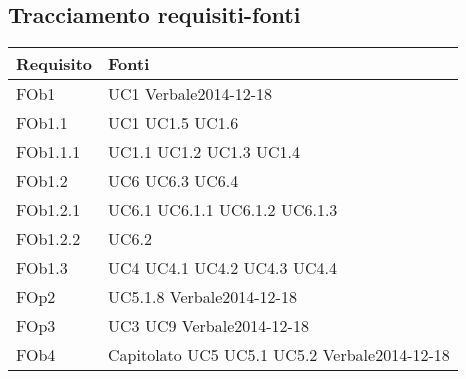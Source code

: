 \subsection{ Tracciamento requisiti-fonti}
	
\begin{longtable}{|l|p{4cm}|}
\hline
\textbf{Requisito} & \textbf{Fonti} \\
\hline
FOb1 & UC1 \linebreak Verbale2014-12-18 \linebreak \\ 
\hline
FOb1.1 & UC1 \linebreak  UC1.5 \linebreak  UC1.6 \linebreak  \\ 
\hline
FOb1.1.1 & UC1.1 \linebreak  UC1.2 \linebreak  UC1.3 \linebreak  UC1.4 \linebreak  \\ 
\hline
FOb1.2 & UC6 \linebreak  UC6.3 \linebreak  UC6.4 \linebreak  \\ 
\hline
FOb1.2.1 & UC6.1 \linebreak  UC6.1.1 \linebreak  UC6.1.2 \linebreak  UC6.1.3 \linebreak  \\ 
\hline
FOb1.2.2 & UC6.2 \linebreak  \\ 
\hline
FOb1.3 & UC4 \linebreak  UC4.1 \linebreak  UC4.2 \linebreak  UC4.3 \linebreak  UC4.4 \linebreak  \\ 
\hline
FOp2 & UC5.1.8 \linebreak Verbale2014-12-18 \linebreak \\ 
\hline
FOp3 & UC3 \linebreak UC9 \linebreak Verbale2014-12-18 \linebreak \\ 
\hline
FOb4 & Capitolato \linebreak UC5 \linebreak UC5.1 \linebreak UC5.2 \linebreak Verbale2014-12-18 \linebreak \\ 

\end{longtable}
